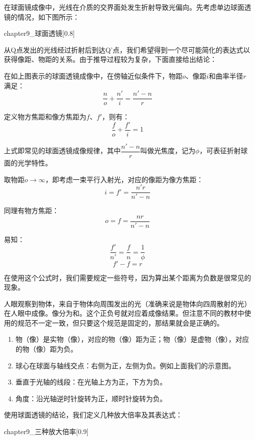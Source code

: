 在球面镜成像中，光线在介质的交界面处发生折射导致光偏向。先考虑单边球面透镜的情况，如下图所示：
\begin{singlefigure}[球面透镜]{chapter9_球面透镜}[0.8]
\end{singlefigure}

从Q点发出的光线经过折射后到达Q'点，我们希望得到一个尽可能简化的表达式以获得像距、物距的关系。由于推导过程较为复杂，下面直接给出结论：
\begin{law}
    在如上图表示的球面透镜成像中，在傍轴近似条件下，物距$o$、像距$i$和曲率半径$r$满足：
    \[\dfrac{n}{o} + \dfrac{n'}{i} = \dfrac{n'-n}{r}\]

    定义物方焦距和像方焦距为$f$、$f'$，则有：
    \[\dfrac{f}{o} + \dfrac{f'}{i} = 1\]
\end{law}

上式即常见的球面透镜成像规律，其中$\dfrac{n'-n}{r}$叫做光焦度，记为$\phi$，可表征折射球面的光学特性。

取物距$o\rightarrow \infty$，即考虑一束平行入射光，对应的像距为像方焦距：
\[i = f' = \dfrac{n' r}{n'-n}\]

同理有物方焦距：
\[o = f = \dfrac{n r}{n'-n}\]

易知：
\[\dfrac{f'}{n'} = \dfrac{f}{n} = \dfrac{1}{\phi}\]
\[f' - f = r\]

在使用这个公式时，我们需要规定一些符号，因为算出某个距离为负数是很常见的现象。

人眼观察到物体，来自于物体向周围发出的光（准确来说是物体向四周散射的光）在人眼中成像。像分为和。这个正负号就对应着成像结果。但注意不同的教材中使用的规范不一定一致，但只要这个规范是固定的，那结果就会是正确的。
\begin{enumerate}
    \item 物（像）是实物（像），对应的物（像）距为正；物（像）是虚物（像），对应的物（像）距为负。
    \item 球心在球面与轴线交点：右侧为正，左侧为负。例如上面我们的示意图。
    \item 垂直于光轴的线段：在光轴上方为正，下方为负。
    \item 角度：沿光轴逆时针旋转为正，顺时针旋转为负。
\end{enumerate}

使用球面透镜的结论，我们定义几种放大倍率及其表达式：
\begin{singlefigure}[球面透镜成像示意图]{chapter9_三种放大倍率}[0.9]
\end{singlefigure}

